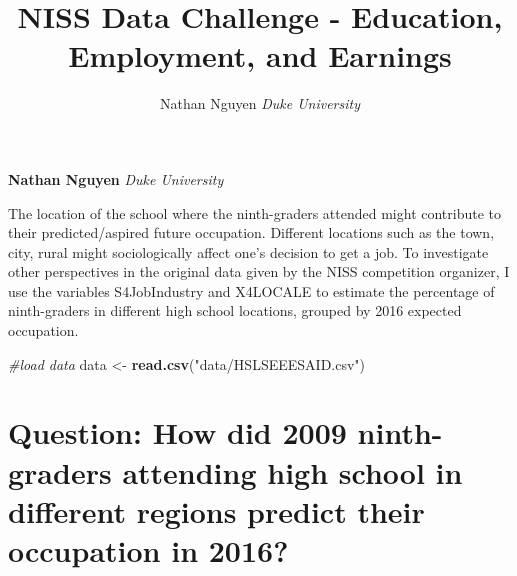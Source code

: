 \documentclass[11pt,]{article}
\title{NISS Data Challenge - Education, Employment, and Earnings  }
\author{\Large Nathan Nguyen\vspace{0.05in} \newline\normalsize\emph{Duke University}  }
\date{}
\newcommand*{\authorfont}{\fontfamily{phv}\selectfont}
\renewenvironment{abstract}
 {{%
    \setlength{\leftmargin}{0mm}
    \setlength{\rightmargin}{\leftmargin}%
  }%
  \relax}
 {\endlist}
\newenvironment{Shaded}{\begin{snugshade}}{\end{snugshade}}
\newcommand{\CommentTok}[1]{\textcolor[rgb]{0.56,0.35,0.01}{\textit{#1}}}
\newcommand{\KeywordTok}[1]{\textcolor[rgb]{0.13,0.29,0.53}{\textbf{#1}}}
\newcommand{\NormalTok}[1]{#1}
\newcommand{\StringTok}[1]{\textcolor[rgb]{0.31,0.60,0.02}{#1}}
\begin{document}
	
%

{%
\setlength{\parindent}{0pt}
\thispagestyle{plain}
{\fontsize{18}{20}\selectfont\raggedright 
\maketitle  %

}

{
   \vskip 13.5pt\relax \normalsize\fontsize{11}{12} 
\textbf{\authorfont Nathan Nguyen} \hskip 15pt \emph{\small Duke University}   

}

}








\begin{abstract}

    \hbox{\vrule height .2pt width 39.14pc}

    \vskip 8.5pt %

\noindent The location of the school where the ninth-graders attended might
contribute to their predicted/aspired future occupation. Different
locations such as the town, city, rural might sociologically affect
one's decision to get a job. To investigate other perspectives in the
original data given by the NISS competition organizer, I use the
variables S4JobIndustry and X4LOCALE to estimate the percentage of
ninth-graders in different high school locations, grouped by 2016
expected occupation.


    \hbox{\vrule height .2pt width 39.14pc}


\end{abstract}


\vskip 6.5pt


\noindent  \begin{Shaded}
\begin{Highlighting}[]
\CommentTok{#load data}
\NormalTok{data <-}\StringTok{ }\KeywordTok{read.csv}\NormalTok{(}\StringTok{"data/HSLSEEESAID.csv"}\NormalTok{)}
\end{Highlighting}
\end{Shaded}

\hypertarget{question-how-did-2009-ninth-graders-attending-high-school-in-different-regions-predict-their-occupation-in-2016}{%
\section{Question: How did 2009 ninth-graders attending high school in
different regions predict their occupation in
2016?}\label{question-how-did-2009-ninth-graders-attending-high-school-in-different-regions-predict-their-occupation-in-2016}}
\end{document}
